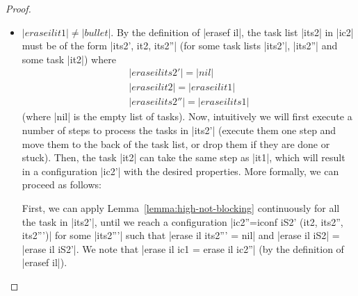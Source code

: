 \begin{proof}
\begin{itemize}
    \item $|erase il it1|\neq|bullet|$.
    By the definition of |erasef il|, the task list |its2|
    in |ic2| must be of the
    form |its2', it2, its2''| (for some task lists |its2'|, |its2''| and
    some task |it2|)
    where
    \begin{align}
    |erase il its2'| = |nil| \\
    |erase il it2| = |erase il it1| \\
    |erase il its2''| = |erase il its1|
    \end{align}
    (where |nil| is the empty list of tasks).
    Now, intuitively we will first execute a number of steps to process
    the tasks in |its2'| (execute them one step and move them to the back
    of the task list, or drop them if they are done or stuck).  Then, the task
    |it2| can take the same step as |it1|, which will result in a configuration
    |ic2'|
    with the desired properties.
    More formally, we can proceed as follows:
    
    First, we can apply Lemma~\ref{lemma:high-not-blocking} continuously
    for all the task in |its2'|,
    until we reach a configuration |ic2''=iconf iS2' (it2, its2'', its2''')|
    for some |its2'''| such
    that |erase il its2''' = nil| and |erase il iS2| = |erase il iS2'|.
    We note that |erase il ic1 = erase il ic2''| (by the definition of
    |erasef il|).
    

\end{itemize}
\end{proof}
